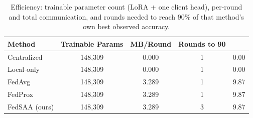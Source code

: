 \begin{table}[t]
\centering
\caption{Efficiency: trainable parameter count (LoRA + one client head), per-round and total communication, and rounds needed to reach 90\% of that method's own best observed accuracy.}
\label{tab:efficiency}
\begin{tabular}{lcccc}
\toprule
Method & Trainable Params & MB/Round & Rounds to 90\\%
\midrule
Centralized & 148,309 & 0.000 & 1 & 0.00 \\
Local-only & 148,309 & 0.000 & 1 & 0.00 \\
FedAvg & 148,309 & 3.289 & 1 & 9.87 \\
FedProx & 148,309 & 3.289 & 1 & 9.87 \\
FedSAA (ours) & 148,309 & 3.289 & 3 & 9.87 \\
\bottomrule
\end{tabular}
\end{table}
